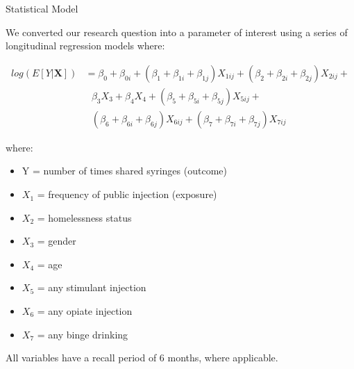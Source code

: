 \documentclass[ignorenonframetext,]{beamer}
\providecommand{\tightlist}{%
  \setlength{\itemsep}{0pt}\setlength{\parskip}{0pt}}
\begin{document}
\begin{frame}{Statistical Model}

We converted our research question into a parameter of interest using a
series of longitudinal regression models where: \vspace{-9pt}

\begin{align*}
log (E[Y|\textbf{X}]) &= \beta_0 + \beta_{0i} + (\beta_1 + \beta_{1i} + \beta_{1j}) X_{1ij} + (\beta_2 + \beta_{2i} + \beta_{2j}) X_{2ij} + \\
&\ \ \ \beta_3X_3 + \beta_4X_4 + (\beta_5 + \beta_{5i} + \beta_{5j}) X_{5ij} + \\
&\ \ \ (\beta_6 + \beta_{6i} + \beta_{6j}) X_{6ij} + (\beta_7 + \beta_{7i} + \beta_{7j}) X_{7ij}
\end{align*}

\small
where:

\vspace{-4pt}

\begin{itemize}
\tightlist
\item
  Y = number of times shared syringes (outcome)
\item
  \(X_1\) = frequency of public injection (exposure)
\item
  \(X_2\) = homelessness status
\item
  \(X_3\) = gender
\item
  \(X_4\) = age
\item
  \(X_5\) = any stimulant injection
\item
  \(X_6\) = any opiate injection
\item
  \(X_7\) = any binge drinking
\end{itemize}

All variables have a recall period of 6 months, where applicable.

\normalsize

\end{frame}
\end{document}
